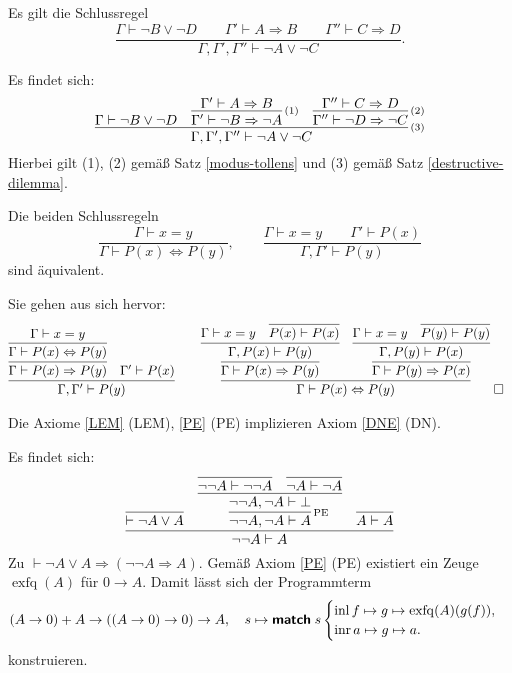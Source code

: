 \begin{Satz}
Es gilt die Schlussregel
\[\dfrac{\Gamma\vdash \neg B\lor \neg D\qquad
\Gamma'\vdash A\Rightarrow B\qquad\Gamma''\vdash C\Rightarrow D}{
\Gamma,\Gamma',\Gamma''\vdash \neg A\lor \neg C}.\]
\end{Satz}
\begin{Beweis}
Es findet sich:
\[
\infer[\infernote{(3)}]{\Gamma,\Gamma',\Gamma''\vdash \neg A\lor \neg C}{
  \Gamma\vdash \neg B\lor \neg D
  & \infer[\infernote{(1)}]{\Gamma'\vdash\neg B\Rightarrow\neg A}{
      \Gamma'\vdash A\Rightarrow B}
  & \infer[\infernote{(2)}]{\Gamma''\vdash\neg D\Rightarrow\neg C}{
      \Gamma''\vdash C\Rightarrow D}}
\]
Hierbei gilt (1), (2) gemäß Satz \ref{modus-tollens} und (3) gemäß Satz
\ref{destructive-dilemma}.\,\qedsymbol
\end{Beweis}

\begin{Satz} Die beiden Schlussregeln
\[\dfrac{\Gamma\vdash x=y}{\Gamma\vdash P(x)\Leftrightarrow P(y)},\qquad
\dfrac{\Gamma\vdash x=y\qquad\Gamma'\vdash P(x)}{\Gamma,\Gamma'\vdash P(y)}\]
sind äquivalent.
\end{Satz}
\begin{Beweis}
Sie gehen aus sich hervor:
\[
\begin{array}{@{}l@{\qquad}l}
\infer{\Gamma,\Gamma'\vdash P(y)}{
  \infer{\Gamma\vdash P(x)\Rightarrow P(y)}{
    \infer{\Gamma\vdash P(x)\Leftrightarrow P(y)}{\Gamma\vdash x=y}}
& \Gamma'\vdash P(x)}
&
\infer{\Gamma\vdash P(x)\Leftrightarrow P(y)}{
  \infer{\Gamma\vdash P(x)\Rightarrow P(y)}{
    \infer{\Gamma, P(x)\vdash P(y)}{
      \Gamma\vdash x=y & \infer{P(x)\vdash P(x)}{}}}
& \infer{\Gamma\vdash P(y)\Rightarrow P(x)}{
    \infer{\Gamma,P(y)\vdash P(x)}{
      \Gamma\vdash x=y & \infer{P(y)\vdash P(y)}{}}}}\;\qedsymbol
\end{array}
\]
\end{Beweis}

\begin{Satz} Die Axiome \ref{LEM} (LEM), \ref{PE} (PE)
implizieren Axiom \ref{DNE} (DN).
\end{Satz}
\begin{Beweis} Es findet sich:
\[
\infer{\neg\neg A\vdash A}{
  \infer{\vdash\neg A\lor A}{}
& \infer[\infernote{PE}]{\neg\neg A,\neg A\vdash A}{
    \infer{\neg\neg A,\neg A\vdash\bot}{
      \infer{\neg\neg A\vdash\neg\neg A}{}
    & \infer{\neg A\vdash\neg A}{}}}
& \infer{A\vdash A}{}}
\]
Zu $\vdash \neg A \lor A\Rightarrow (\neg\neg A \Rightarrow A)$.
Gemäß Axiom \ref{PE} (PE) existiert ein Zeuge $\operatorname{exfq}(A)$
für $0\to A$. Damit lässt sich der Programmterm
\[(A\to 0) + A \to ((A\to 0)\to 0)\to A,\quad
s\mapsto\text{{\normalfont\sffamily\bfseries match}}\; s\begin{cases}
\operatorname{inl} f\mapsto g\mapsto \operatorname{exfq}(A)(g(f)),\\
\operatorname{inr} a\mapsto g\mapsto a.
\end{cases}\]
konstruieren.\;\qedsymbol
\end{Beweis}

